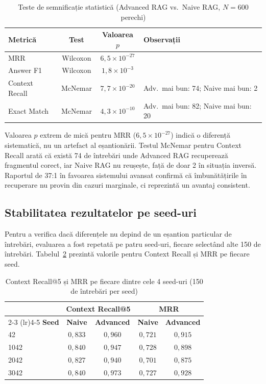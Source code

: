 \begin{table}[ht]
\centering
\begin{tabular}{lccl}
\toprule
\textbf{Metrică} & \textbf{Test} & \textbf{Valoarea $p$} & \textbf{Observații} \\
\midrule
MRR            & Wilcoxon & $6{,}5 \times 10^{-27}$ & \\
Answer F1      & Wilcoxon & $1{,}8 \times 10^{-3}$  & \\
Context Recall & McNemar  & $7{,}7 \times 10^{-20}$ & Adv.\ mai bun: 74; Naive mai bun: 2 \\
Exact Match    & McNemar  & $4{,}3 \times 10^{-10}$ & Adv.\ mai bun: 82; Naive mai bun: 20 \\
\bottomrule
\end{tabular}
\caption{Teste de semnificație statistică (Advanced RAG vs.\ Naive RAG, $N=600$ perechi)}
\label{tab:significance}
\end{table}

Valoarea $p$ extrem de mică pentru MRR ($6{,}5 \times 10^{-27}$) indică o diferență sistematică, nu un artefact al eșantionării. Testul McNemar pentru Context Recall arată că există 74 de întrebări unde Advanced RAG recuperează fragmentul corect, iar Naive RAG nu reușește, față de doar 2 în situația inversă. Raportul de 37:1 în favoarea sistemului avansat confirmă că îmbunătățirile în recuperare nu provin din cazuri marginale, ci reprezintă un avantaj consistent.

\subsection{Stabilitatea rezultatelor pe seed-uri}

Pentru a verifica dacă diferențele nu depind de un eșantion particular de întrebări, evaluarea a fost repetată pe patru seed-uri, fiecare selectând alte 150 de întrebări. Tabelul~\ref{tab:per-seed} prezintă valorile pentru Context Recall și MRR pe fiecare seed.

\begin{table}[ht]
\centering
\begin{tabular}{lcccc}
\toprule
 & \multicolumn{2}{c}{\textbf{Context Recall@5}} & \multicolumn{2}{c}{\textbf{MRR}} \\
\cmidrule(lr){2-3} \cmidrule(lr){4-5}
\textbf{Seed} & \textbf{Naive} & \textbf{Advanced} & \textbf{Naive} & \textbf{Advanced} \\
\midrule
42   & $0{,}833$ & $0{,}960$ & $0{,}721$ & $0{,}915$ \\
1042 & $0{,}840$ & $0{,}947$ & $0{,}728$ & $0{,}898$ \\
2042 & $0{,}827$ & $0{,}940$ & $0{,}701$ & $0{,}875$ \\
3042 & $0{,}840$ & $0{,}973$ & $0{,}727$ & $0{,}928$ \\
\bottomrule
\end{tabular}
\caption{Context Recall@5 și MRR pe fiecare dintre cele 4 seed-uri (150 de întrebări per seed)}
\label{tab:per-seed}
\end{table}

